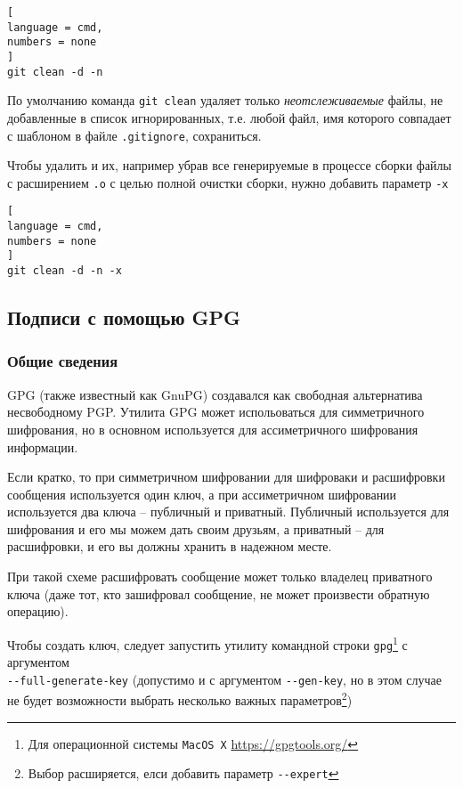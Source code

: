 \documentclass[%
	11pt,
	a4paper,
	utf8,
		]{article}
\begin{document}
\begin{lstlisting}[
language = cmd,
numbers = none
]
git clean -d -n
\end{lstlisting}

По умолчанию команда \lstinline{git clean} удаляет только \emph{неотслеживаемые} файлы, не добавленные в список игнорированных, т.е. любой файл, имя которого совпадает с шаблоном в файле \texttt{.gitignore}, сохраниться.

Чтобы удалить и их, например убрав все генерируемые в процессе сборки файлы с расширением \texttt{.o} с целью полной очистки сборки, нужно добавить параметр \lstinline{-x}


\begin{lstlisting}[
language = cmd,
numbers = none
]
git clean -d -n -x
\end{lstlisting}


\subsection{Подписи с помощью GPG}

\subsubsection{Общие сведения}

GPG (также известный как GnuPG) создавался как свободная альтернатива несвободному PGP. Утилита GPG может испольоваться для симметричного шифрования, но в основном используется для ассиметричного шифрования информации.

Если кратко, то при симметричном шифровании для шифроваки и расшифровки сообщения используется один ключ, а при ассиметричном шифровании используется два ключа -- публичный и приватный. Публичный используется для шифрования и его мы можем дать своим друзьям, а приватный -- для расшифровки, и его вы должны хранить в надежном месте.

При такой схеме расшифровать сообщение может только владелец приватного ключа (даже тот, кто зашифровал сообщение, не может произвести обратную операцию).


Чтобы создать ключ, следует запустить утилиту командной строки \texttt{gpg}\footnote{Для операционной системы \texttt{MacOS X} \url{https://gpgtools.org/}} с аргументом \\\mbox{\lstinline{--full-generate-key}} (допустимо и с аргументом \lstinline{--gen-key}, но в этом случае не будет возможности выбрать несколько важных параметров\footnote{Выбор расширяется, елси добавить параметр \lstinline{--expert}})
\end{document}
